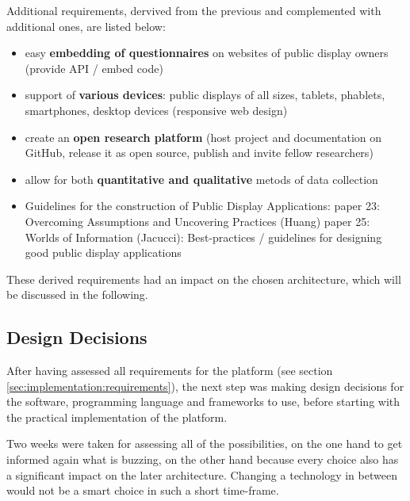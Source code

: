 	Additional requirements, dervived from the previous and complemented with additional ones, are listed below:

	\begin{itemize}[itemsep=0pt] 
	\item easy \textbf{embedding of questionnaires} on websites of public display owners (provide API / embed code)
	\item support of \textbf{various devices}: public displays of all sizes, tablets, phablets, smartphones, desktop devices (responsive web design)
	\item create an \textbf{open research platform} (host project and documentation on GitHub, release it as open source, publish and invite fellow researchers)
	\item allow for both \textbf{quantitative and qualitative} metods of data collection

	\item Guidelines for the construction of Public Display Applications:		paper 23: Overcoming Assumptions and Uncovering Practices (Huang)
		paper 25: Worlds of Information (Jacucci): Best-practices / guidelines for designing good public display applications

	\end{itemize}




	These derived requirements had an impact on the chosen architecture, which will be discussed in the following.



\subsection{Design Decisions}
\label{sec:implementation:design-decisions}

	After having assessed all requirements for the platform (see section \ref{sec:implementation:requirements}), the next step was making design decisions for the software, programming language and frameworks to use, before starting with the practical implementation of the platform. 

	Two weeks were taken for assessing all of the possibilities, on the one hand to get informed again what is buzzing, on the other hand because every choice also has a significant impact on the later architecture. Changing a technology in between would not be a smart choice in such a short time-frame. 

